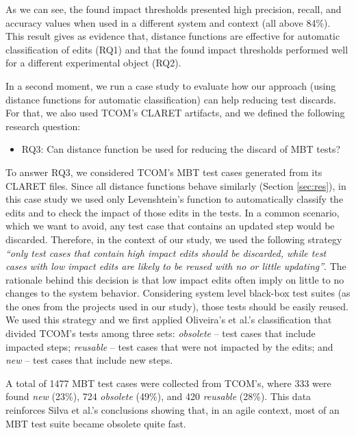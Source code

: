 As we can see, the found impact thresholds presented high precision, recall, and accuracy values when used in a different system and context (all above 84\%). This result gives as evidence that, distance functions are effective for automatic classification of edits (RQ1) and that the found impact thresholds performed well for a different experimental object (RQ2).

In a second moment, we 
run a case study to evaluate how our approach (using distance functions for automatic classification) can help reducing test discards. For that, we also used TCOM's CLARET artifacts, and we defined the following research question:
\begin{itemize}
\item RQ3: Can distance function be used for reducing the discard of MBT tests? 
\end{itemize}

To answer RQ3, we considered TCOM's MBT test cases generated from its CLARET files. Since all distance functions behave similarly (Section \ref{sec:res}), in this case study we used only Levenshtein's function to automatically classify the edits and to check the impact of those edits in the tests. In a common scenario, which we want to avoid, any test case that contains an updated step would be discarded. Therefore, in the context of our study, we used the following strategy \textit{``only test cases that contain high impact edits should be discarded, while test cases with low impact edits are likely to be reused with no or little updating''}. The rationale behind this decision is that low impact edits often imply on little to no changes to the system behavior. Considering system level black-box test suites (as the ones from the projects used in our study), those tests should be easily reused. We used this strategy and we first applied Oliveira's et al.'s  classification \cite{de2016full} that divided TCOM's tests among three sets:  \textit{obsolete} -- test cases that include impacted steps; \textit{reusable} -- test cases that were not impacted by the edits; and \textit{new} -- test cases that include new steps. 

A total of 1477 MBT test cases were collected from TCOM's, where 333 were found \textit{new} (23\%), 724 \textit{obsolete} (49\%), and 420 \textit{reusable} (28\%). This data reinforces Silva et al.'s \cite{Silva:2018:SIM:3266003.3266009} 
conclusions showing that, in an agile context, most of an MBT test suite became obsolete quite fast. 

